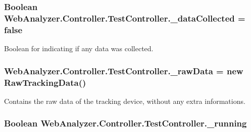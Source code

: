 \subsubsection[{\+\_\+data\+Collected}]{\setlength{\rightskip}{0pt plus 5cm}Boolean Web\+Analyzer.\+Controller.\+Test\+Controller.\+\_\+data\+Collected = {\bf false}\hspace{0.3cm}{\ttfamily [private]}}\label{class_web_analyzer_1_1_controller_1_1_test_controller_a7d63bbfba4672d52414c318b397c504b}


Boolean for indicating if any data was collected. 

\hypertarget{class_web_analyzer_1_1_controller_1_1_test_controller_ac2155d50816dddd7e62689655d3a978f}{}
\subsubsection[{\+\_\+raw\+Data}]{ Web\+Analyzer.\+Controller.\+Test\+Controller.\+\_\+raw\+Data = new {\bf Raw\+Tracking\+Data}()\hspace{0.3cm}{\ttfamily [private]}}\label{class_web_analyzer_1_1_controller_1_1_test_controller_ac2155d50816dddd7e62689655d3a978f}


Contains the raw data of the tracking device, without any extra informations. 

\hypertarget{class_web_analyzer_1_1_controller_1_1_test_controller_a49aaaa975ccbeedcd52fb03288cea3ef}{}
\subsubsection[{\+\_\+running}]{\setlength{\rightskip}{0pt plus 5cm}Boolean Web\+Analyzer.\+Controller.\+Test\+Controller.\+\_\+running\hspace{0.3cm}{\ttfamily [private]}}\label{class_web_analyzer_1_1_controller_1_1_test_controller_a49aaaa975ccbeedcd52fb03288cea3ef}


